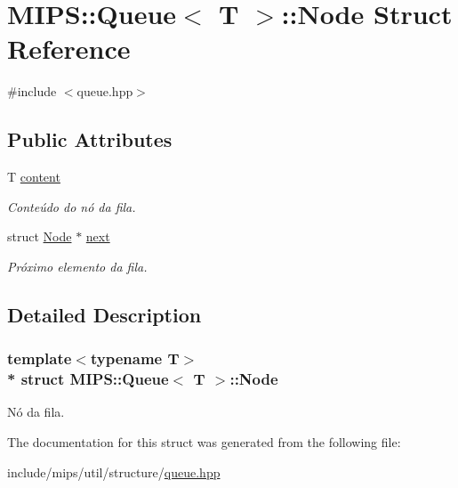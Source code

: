 \hypertarget{structMIPS_1_1Queue_1_1Node}{}\section{M\+I\+PS\+:\+:Queue$<$ T $>$\+:\+:Node Struct Reference}
\label{structMIPS_1_1Queue_1_1Node}


{\ttfamily \#include $<$queue.\+hpp$>$}

\subsection*{Public Attributes}
\begin{DoxyCompactItemize}
\item 
T \hyperlink{structMIPS_1_1Queue_1_1Node_a9d9a04736b082d82495e40d5aa1135b0}{content}\hypertarget{structMIPS_1_1Queue_1_1Node_a9d9a04736b082d82495e40d5aa1135b0}{}\label{structMIPS_1_1Queue_1_1Node_a9d9a04736b082d82495e40d5aa1135b0}

\begin{DoxyCompactList}\small\item\em Conteúdo do nó da fila. \end{DoxyCompactList}\item 
struct \hyperlink{structMIPS_1_1Queue_1_1Node}{Node} $\ast$ \hyperlink{structMIPS_1_1Queue_1_1Node_abd5a8271355d9455cf1cc038217fbecc}{next}\hypertarget{structMIPS_1_1Queue_1_1Node_abd5a8271355d9455cf1cc038217fbecc}{}\label{structMIPS_1_1Queue_1_1Node_abd5a8271355d9455cf1cc038217fbecc}

\begin{DoxyCompactList}\small\item\em Próximo elemento da fila. \end{DoxyCompactList}\end{DoxyCompactItemize}


\subsection{Detailed Description}
\subsubsection*{template$<$typename T$>$\\*
struct M\+I\+P\+S\+::\+Queue$<$ T $>$\+::\+Node}

Nó da fila. 

The documentation for this struct was generated from the following file\+:\begin{DoxyCompactItemize}
\item 
include/mips/util/structure/\hyperlink{queue_8hpp}{queue.\+hpp}\end{DoxyCompactItemize}

